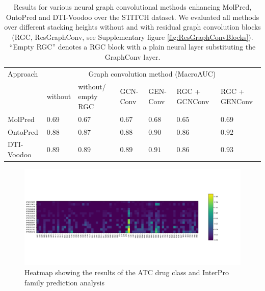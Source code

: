 \documentclass[]{article}
\newcommand{\name}{DTI-Voodoo}
\begin{document}
\clearpage
\begin{table}[ht]
	\centering

	\begin{tabular}{|p{2.0cm}|p{1.1cm}|p{1.2cm}|p{0.8cm}|p{0.8cm}|p{1.2cm}|p{1.2cm}|}
		\hline
		Approach&\multicolumn{6}{c|}{Graph convolution method (MacroAUC)}\\
		&without&without/ empty RGC&GCN-Conv&GEN-Conv&RGC + GCNConv&RGC + GENConv\\
		\hline
		MolPred & $0.69$ & $0.67$& $0.67$& $0.68$& $0.65$& $0.69$\\
		\hline
		OntoPred &$0.88$ &$0.87$ &$0.88$&$0.90$&$0.86$&$0.92$\\
		\hline
		\name& $0.89$&$0.89$& $0.89$& $0.91$& $0.86$& $\mathbf{0.93}$\\
		\hline
	\end{tabular}
	\caption{\label{tab:Results}Results for various neural graph
          convolutional methods enhancing MolPred, OntoPred and
          \name{} over the STITCH dataset. We evaluated all methods
          over different stacking heights without and with residual
          graph convolution blocks (RGC, ResGraphConv, see
          Supplementary figure \ref{fig:ResGraphConvBlocks}). ``Empty
          RGC'' denotes a RGC block with a plain neural layer
          substituting the GraphConv layer.}
\end{table}

\clearpage
\begin{figure}[ht]%
	\centerline{\includegraphics[width=1.1\textwidth]{../figures/ATC_Interpro_heatmap.png}}
	\caption{Heatmap showing the results of the ATC drug class and InterPro family prediction analysis}
	\label{fig:ATCInterproHeatmap}
\end{figure}
\end{document}
